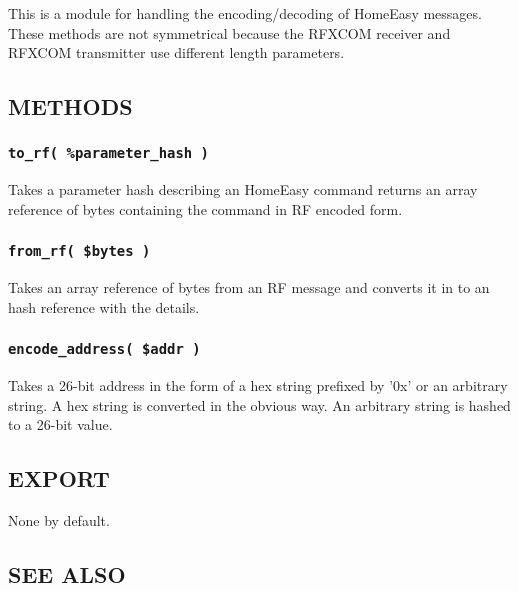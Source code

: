 This is a module for handling the encoding/decoding of HomeEasy
messages.  These methods are not symmetrical because the RFXCOM
receiver and RFXCOM transmitter use different length parameters.

\subsection*{METHODS\label{xPL::HomeEasy_METHODS}}
\subsubsection*{\texttt{to\_rf( \%parameter\_hash )}\label{xPL::HomeEasy_to_rf_parameter_hash_}}


Takes a parameter hash describing an HomeEasy command returns an array
reference of bytes containing the command in RF encoded form.

\subsubsection*{\texttt{from\_rf( \$bytes )}\label{xPL::HomeEasy_from_rf_bytes_}}


Takes an array reference of bytes from an RF message and converts it
in to an hash reference with the details.

\subsubsection*{\texttt{encode\_address( \$addr )}\label{xPL::HomeEasy_encode_address_addr_}}


Takes a 26-bit address in the form of a hex string prefixed by '0x' or
an arbitrary string.  A hex string is converted in the obvious way.
An arbitrary string is hashed to a 26-bit value.

\subsection*{EXPORT\label{xPL::HomeEasy_EXPORT}}


None by default.

\subsection*{SEE ALSO\label{xPL::HomeEasy_SEE_ALSO}}



